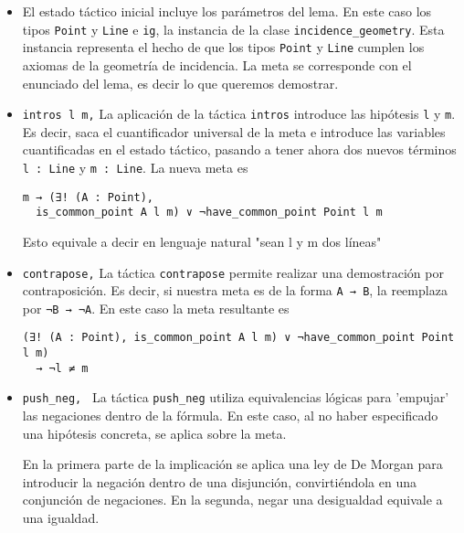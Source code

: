 \begin{itemize}

	\item El estado táctico inicial incluye los parámetros del lema. En este caso
	      los tipos \lstinline{Point} y \lstinline{Line} e \lstinline{ig}, la
	      instancia de la clase \lstinline{incidence_geometry}. Esta instancia
	      representa el hecho de que los tipos \lstinline{Point} y \lstinline{Line}
	      cumplen los axiomas de la geometría de incidencia. La meta se corresponde
	      con el enunciado del lema, es decir lo que queremos demostrar.

	\item \lstinline{intros l m,} La aplicación de la táctica \lstinline{intros}
	      introduce las hipótesis \lstinline{l} y \lstinline{m}. Es decir, saca el
	      cuantificador universal de la meta e introduce las variables cuantificadas
	      en el estado táctico, pasando a tener ahora dos nuevos términos
	      \lstinline{l : Line} y \lstinline{m : Line}. La nueva meta es

	      \begin{lstlisting}
m → (∃! (A : Point), 
  is_common_point A l m) ∨ ¬have_common_point Point l m
      \end{lstlisting}
	      Esto equivale a decir en lenguaje natural "sean l y m dos líneas"


	\item \lstinline{contrapose,} La táctica \lstinline{contrapose} permite realizar una
	      demostración por contraposición. Es decir, si nuestra meta es de la
	      forma \lstinline{A → B}, la reemplaza por \lstinline{¬B → ¬A}. En este
	      caso la meta resultante es
	      \begin{lstlisting}
(∃! (A : Point), is_common_point A l m) ∨ ¬have_common_point Point l m) 
  → ¬l ≠ m
      \end{lstlisting}

	\item \lstinline{push_neg, } La táctica \lstinline{push_neg} utiliza equivalencias
	      lógicas para 'empujar' las negaciones dentro de la fórmula. En este
	      caso, al no haber especificado una hipótesis concreta, se aplica sobre
	      la meta.

	      En la primera parte de la implicación se aplica una ley de De Morgan
	      para introducir la negación dentro de una disjunción, convirtiéndola en
	      una conjunción de negaciones. En la segunda, negar una desigualdad
	      equivale a una igualdad.


\end{itemize}
